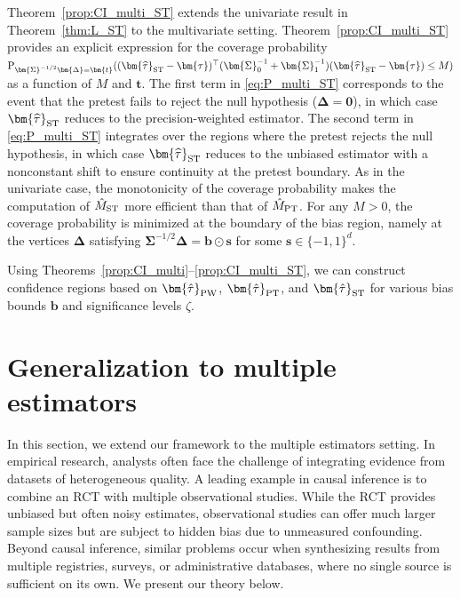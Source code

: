 \documentclass[11pt]{article}
\def\P{{\mathrm P}}
\newcommand{\htau}{\widehat\tau}
\numberwithin{equation}{section}
\theoremstyle{definition}
\begin{document}
Theorem~\ref{prop:CI_multi_ST} extends the univariate result in Theorem~\ref{thm:L_ST} to the multivariate setting. Theorem~\ref{prop:CI_multi_ST} provides an explicit expression for the coverage probability $\P_{\bm{\Sigma}^{-1/2}\bm{\Delta} = \bm{t}}((\bm{\htau}_{\rm ST}-\bm{\tau})^\top (\bm{\Sigma}_0^{-1} + \bm{\Sigma}_1^{-1})(\bm{\htau}_{\rm ST}-\bm{\tau})\le M)$ as a function of $M$ and $\bm{t}$. The first term in \eqref{eq:P_multi_ST} corresponds to the event that the pretest fails to reject the null hypothesis ($\bm{\Delta} = \bm{0}$), in which case $\bm{\htau}_{\rm ST}$ reduces to the precision-weighted estimator. The second term in \eqref{eq:P_multi_ST} integrates over the regions where the pretest rejects the null hypothesis, in which case $\bm{\htau}_{\rm ST}$ reduces to the unbiased estimator with a nonconstant shift to ensure continuity at the pretest boundary. As in the univariate case, the monotonicity of the coverage probability makes the computation of $\hat{M}_{\rm ST}$ more efficient than that of $\hat{M}_{\rm PT}$. For any $M>0$, the coverage probability is minimized at the boundary of the bias region, namely at the vertices $\bm{\Delta}$ satisfying $\bm{\Sigma}^{-1/2} \bm{\Delta} = \bm{b} \odot \bm{s}$ for some $\bm{s} \in \{-1,1\}^d$.

Using Theorems~\ref{prop:CI_multi}--\ref{prop:CI_multi_ST}, we can construct confidence regions based on $\bm{\hat\tau}_{\rm PW}$, $\bm{\hat\tau}_{\rm PT}$, and $\bm{\hat\tau}_{\rm ST}$ for various bias bounds $\bm{b}$ and significance levels $\zeta$.


\section{Generalization to multiple estimators}\label{sec:data_fusion}


In this section, we extend our framework to the multiple estimators setting. In empirical research, analysts often face the challenge of integrating evidence from datasets of heterogeneous quality. A leading example in causal inference is to combine an RCT with multiple observational studies. While the RCT provides unbiased but often noisy estimates, observational studies can offer much larger sample sizes but are subject to hidden bias due to unmeasured confounding. Beyond causal inference, similar problems occur when synthesizing results from multiple registries, surveys, or administrative databases, where no single source is sufficient on its own. We present our theory below.
\end{document}

